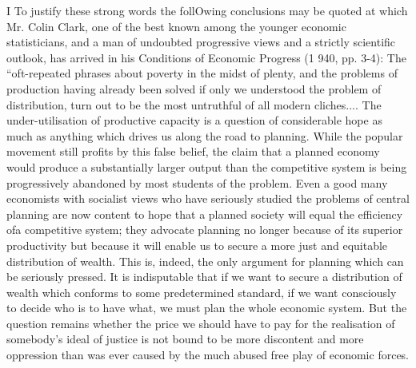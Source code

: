\documentclass[11pt,openany]{book}
\begin{document}
I To justify these strong words the follOwing conclusions may be quoted at which Mr. Colin Clark, one of the best known among the younger economic statisticians, and a man of undoubted progressive views and a strictly scientific outlook, has arrived in his Conditions of Economic Progress (1 940, pp. 3-4): The ``oft-repeated phrases about poverty in the midst of plenty, and the problems of production having already been solved if only we understood the problem of distribution, turn out to be the most untruthful of all modern cliches.... The under-utilisation of productive capacity is a question of considerable hope as much as anything which drives us along the road to planning. While the popular movement still profits by this false belief, the claim that a planned economy would produce a substantially larger output than the competitive system is being progressively abandoned by most students of the problem. Even a good many economists with socialist views who have seriously studied the problems of central planning are now content to hope that a planned society will equal the efficiency ofa competitive system; they advocate planning no longer because of its superior productivity but because it will enable us to secure a more just and equitable distribution of wealth. This is, indeed, the only argument for planning which can be seriously pressed. It is indisputable that if we want to secure a distribution of wealth which conforms to some predetermined standard, if we want consciously to decide who is to have what, we must plan the whole economic system. But the question remains whether the price we should have to pay for the realisation of somebody's ideal of justice is not bound to be more discontent and more oppression than was ever caused by the much abused free play of economic forces.

\begin{center}\textasteriskcentered\hspace{0.9em}\textasteriskcentered\hspace{0.9em}\textasteriskcentered\end{center}

\begin{center}\textasteriskcentered\hspace{0.9em}\textasteriskcentered\hspace{0.9em}\textasteriskcentered\end{center}

\begin{center}\textasteriskcentered\hspace{0.9em}\textasteriskcentered\hspace{0.9em}\textasteriskcentered\end{center}
\end{document}
